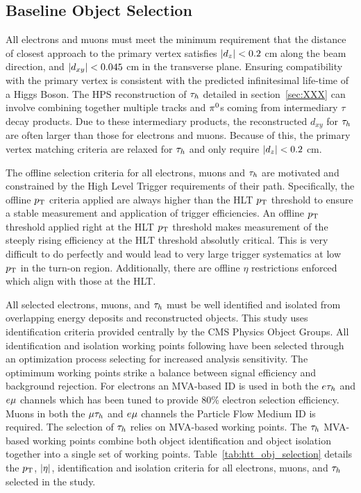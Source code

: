 \subsection{Baseline Object Selection}
All electrons and muons must meet the minimum requirement
that the distance of closest approach to the primary vertex satisfies $\lvert d_z\rvert<0.2$ cm
along the beam direction, and $\lvert d_{xy}\rvert<0.045$ cm in the transverse plane. Ensuring
compatibility with the primary vertex is consistent with the predicted infinitesimal life-time of
a Higgs Boson. The HPS reconstruction of $\tau_{h}$ detailed in section~\ref{sec:XXX} can involve
combining together multiple tracks and $\pi^{0}$s coming from intermediary $\tau$ decay products.
Due to these intermediary products, the reconstructed $d_{xy}$ for $\tau_{h}$ are often
larger than those for electrons and muons.  Because of this, the primary vertex matching
criteria are relaxed for $\tau_{h}$ and only require $\lvert d_z\rvert<0.2$ cm.

The offline selection criteria for all electrons, muons and $\tau_{h}$ are motivated and constrained
by the High Level Trigger requirements of their path.  Specifically, the offline $p_\mathrm{T}$ criteria
applied are always higher than the HLT $p_\mathrm{T}$ threshold to ensure a stable measurement and application
of trigger efficiencies.  An offline $p_\mathrm{T}$ threshold applied right at the HLT $p_\mathrm{T}$ threshold
makes measurement of the steeply rising efficiency at the HLT threshold absolutly critical.
This is very difficult to do perfectly and would lead to very large trigger systematics
at low $p_\mathrm{T}$ in the turn-on region.  Additionally, there are offline $\eta$ restrictions
enforced which align with those at the HLT.

All selected electrons, muons, and $\tau_{h}$ must be well identified and isolated from overlapping
energy deposits and reconstructed objects.  This study uses identification criteria
provided centrally by the CMS Physics Object Groups.  All identification and isolation
working points following have been selected through an optimization process selecting
for increased analysis sensitivity.  The optimimum working points strike a balance
between signal efficiency and background rejection.  For electrons an MVA-based ID
is used in both the $e\tau_{h}$ and $e\mu$ channels which has been tuned to provide 
80\% electron selection efficiency.  Muons in both the $\mu\tau_{h}$ and $e\mu$ channels
the Particle Flow Medium ID is required.  The selection of $\tau_{h}$ relies on MVA-based working
points.  The $\tau_{h}$ MVA-based working points combine both object identification and object
isolation together into a single set of working points.  Table~\ref{tab:htt_obj_selection}
details the $p_\mathrm{T}$, $\lvert\eta\rvert$, identification and isolation criteria for all electrons, muons,
and $\tau_{h}$ selected in the study.


